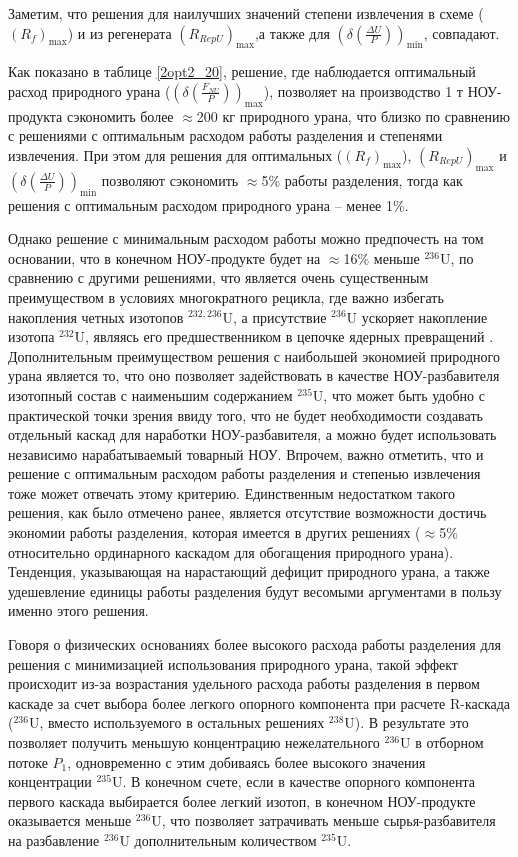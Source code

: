 Заметим, что решения для наилучших значений степени извлечения в схеме ($(R_{f})_\text{max}$) и из регенерата $(R_{RepU})_\text{max}$,а также для $(\delta(\frac{\Delta U}{P}))_\text{min}$, совпадают. 

Как показано в таблице \ref{2opt2_20}, решение, где наблюдается оптимальный расход природного урана ($(\delta(\frac{F_{NU}}{P}))_\text{max}$), позволяет на производство 1 т НОУ-продукта сэкономить более $\approx$200 кг природного урана, что близко по сравнению с решениями с оптимальным расходом работы разделения и степенями извлечения. При этом для решения для оптимальных ($(R_{f})_\text{max}$), $(R_{RepU})_\text{max}$ и $(\delta(\frac{\Delta U}{P}))_\text{min}$ позволяют сэкономить $\approx$5\% работы разделения, тогда как решения с оптимальным расходом природного урана -- менее 1\%.

Однако решение с минимальным расходом работы можно предпочесть на том основании, что в конечном НОУ-продукте будет на $\approx$16\% меньше $^{236}$U, по сравнению с другими решениями, что является очень существенным преимуществом в условиях многократного рецикла, где важно избегать накопления четных изотопов $^{232,236}$U, а присутствие $^{236}$U ускоряет накопление изотопа $^{232}$U, являясь его предшественником в цепочке ядерных превращений \cite{smirnovEvolutionIsotopicComposition2012}. Дополнительным преимуществом решения с наибольшей экономией природного урана является то, что оно позволяет задействовать в качестве НОУ-разбавителя изотопный состав с наименьшим содержанием $^{235}$U, что может быть удобно с практической точки зрения ввиду того, что не будет необходимости создавать отдельный каскад для наработки НОУ-разбавителя, а можно будет использовать независимо нарабатываемый товарный НОУ. Впрочем, важно отметить, что и решение с оптимальным расходом работы разделения и степенью извлечения тоже может отвечать этому критерию.
Единственным недостатком такого решения, как было отмечено ранее, является отсутствие возможности достичь экономии работы разделения, которая имеется в других решениях ($\approx$5\% относительно ординарного каскадом для обогащения природного урана). Тенденция, указывающая на нарастающий дефицит природного урана, а также удешевление единицы работы разделения будут весомыми аргументами в пользу именно этого решения.

Говоря о физических основаниях более высокого расхода работы разделения для решения с минимизацией использования природного урана, такой эффект происходит из-за возрастания удельного расхода работы разделения в первом каскаде за счет выбора более легкого опорного компонента при расчете R-каскада ($^{236}$U, вместо используемого в остальных решениях $^{238}$U). В результате это позволяет получить меньшую концентрацию нежелательного $^{236}$U в отборном потоке $P_{1}$, одновременно с этим добиваясь более высокого значения концентрации $^{235}$U. В конечном счете, если в качестве опорного компонента первого каскада выбирается более легкий изотоп, в конечном НОУ-продукте оказывается меньше $^{236}$U, что позволяет затрачивать меньше сырья-разбавителя на разбавление $^{236}$U дополнительным количеством $^{235}$U.

